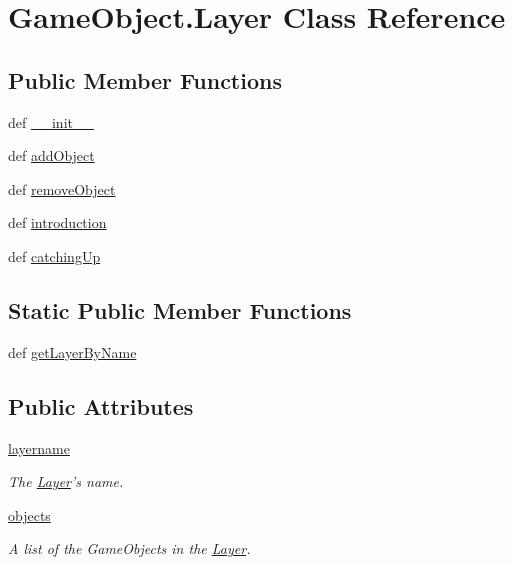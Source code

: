 \hypertarget{classGameObject_1_1Layer}{\section{\-Game\-Object.\-Layer \-Class \-Reference}
\label{classGameObject_1_1Layer}
}
\subsection*{\-Public \-Member \-Functions}
\begin{DoxyCompactItemize}
\item 
def \hyperlink{classGameObject_1_1Layer_a62464efbda1e2a0ac692ba3eb07cb193}{\-\_\-\-\_\-init\-\_\-\-\_\-}
\item 
def \hyperlink{classGameObject_1_1Layer_a958cdf832892dc6e1d3b7d817f7ba241}{add\-Object}
\item 
def \hyperlink{classGameObject_1_1Layer_aa936cacaf059a5b8e5e1f59bd63e563e}{remove\-Object}
\item 
def \hyperlink{classGameObject_1_1Layer_acf0a86a8b98f5d6e64ba3b2855dccfbf}{introduction}
\item 
def \hyperlink{classGameObject_1_1Layer_ab0287a8cfc48f0ce28eb78a918d0c3c3}{catching\-Up}
\end{DoxyCompactItemize}
\subsection*{\-Static \-Public \-Member \-Functions}
\begin{DoxyCompactItemize}
\item 
def \hyperlink{classGameObject_1_1Layer_ae5bf94d8fa5df6e1c814953dbf0ac92a}{get\-Layer\-By\-Name}
\end{DoxyCompactItemize}
\subsection*{\-Public \-Attributes}
\begin{DoxyCompactItemize}
\item 
\hypertarget{classGameObject_1_1Layer_a675b63dabc8dcb983df23e44862cedd8}{\hyperlink{classGameObject_1_1Layer_a675b63dabc8dcb983df23e44862cedd8}{layername}}\label{classGameObject_1_1Layer_a675b63dabc8dcb983df23e44862cedd8}

\begin{DoxyCompactList}\small\item\em \-The \hyperlink{classGameObject_1_1Layer}{\-Layer}'s name. \end{DoxyCompactList}\item 
\hypertarget{classGameObject_1_1Layer_ad5c77836c30757d0fc62da2726742cb7}{\hyperlink{classGameObject_1_1Layer_ad5c77836c30757d0fc62da2726742cb7}{objects}}\label{classGameObject_1_1Layer_ad5c77836c30757d0fc62da2726742cb7}

\begin{DoxyCompactList}\small\item\em \-A list of the \-Game\-Objects in the \hyperlink{classGameObject_1_1Layer}{\-Layer}. \end{DoxyCompactList}\end{DoxyCompactItemize}
